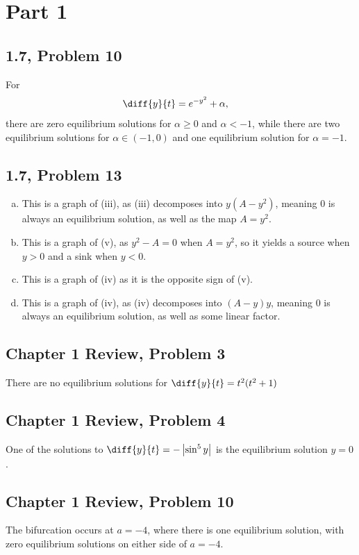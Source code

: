 \documentclass[10pt]{mypackage}
\begin{document}
\RaggedRight
\section{Part 1}%
\subsection{1.7, Problem 10}%
For
\begin{align*}
  \diff{y}{t} &= e^{-y^2} + \alpha,
\end{align*}
there are zero equilibrium solutions for $\alpha \geq 0$ and $\alpha < -1$, while there are two equilibrium solutions for $\alpha \in \left(-1,0\right)$ and one equilibrium solution for $\alpha = -1$.
\subsection{1.7, Problem 13}%
\begin{enumerate}[(a)]
  \item This is a graph of (iii), as (iii) decomposes into $y(A-y^2)$, meaning $0$ is always an equilibrium solution, as well as the map $A = y^2$.
  \item This is a graph of (v), as $y^2 - A = 0$ when $A = y^2$, so it yields a source when $y > 0$ and a sink when $y < 0$.
  \item This is a graph of (iv) as it is the opposite sign of (v).
  \item This is a graph of (iv), as (iv) decomposes into $\left(A-y\right)y$, meaning $0$ is always an equilibrium solution, as well as some linear factor.
\end{enumerate}
\subsection{Chapter 1 Review, Problem 3}%
There are no equilibrium solutions for $\diff{y}{t} = t^2(t^2 + 1)$
\subsection{Chapter 1 Review, Problem 4}%
One of the solutions to $\diff{y}{t} = -\left\vert \sin^5 y \right\vert$ is the equilibrium solution $y = 0$.
\subsection{Chapter 1 Review, Problem 10}%
The bifurcation occurs at $a = -4$, where there is one equilibrium solution, with zero equilibrium solutions on either side of $a = -4$.
\end{document}
